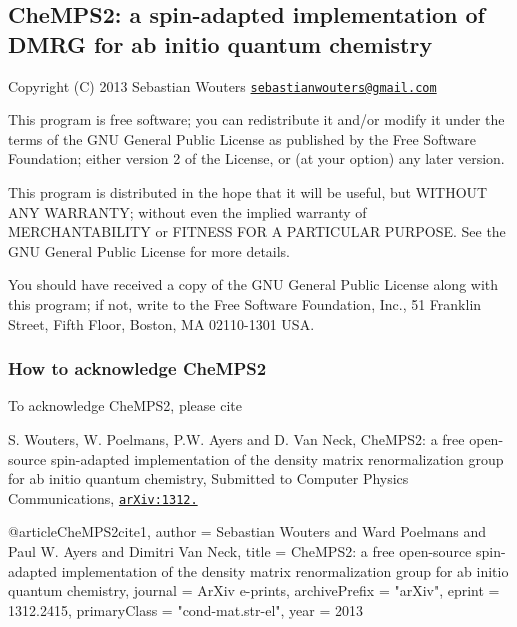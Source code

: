 

\subsection*{Che\-M\-P\-S2\-: a spin-\/adapted implementation of D\-M\-R\-G for ab initio quantum chemistry}

Copyright (C) 2013 Sebastian Wouters \href{mailto:sebastianwouters@gmail.com}{\tt sebastianwouters@gmail.\-com}

This program is free software; you can redistribute it and/or modify it under the terms of the G\-N\-U General Public License as published by the Free Software Foundation; either version 2 of the License, or (at your option) any later version.

This program is distributed in the hope that it will be useful, but W\-I\-T\-H\-O\-U\-T A\-N\-Y W\-A\-R\-R\-A\-N\-T\-Y; without even the implied warranty of M\-E\-R\-C\-H\-A\-N\-T\-A\-B\-I\-L\-I\-T\-Y or F\-I\-T\-N\-E\-S\-S F\-O\-R A P\-A\-R\-T\-I\-C\-U\-L\-A\-R P\-U\-R\-P\-O\-S\-E. See the G\-N\-U General Public License for more details.

You should have received a copy of the G\-N\-U General Public License along with this program; if not, write to the Free Software Foundation, Inc., 51 Franklin Street, Fifth Floor, Boston, M\-A 02110-\/1301 U\-S\-A.

\subsubsection*{How to acknowledge Che\-M\-P\-S2}

To acknowledge Che\-M\-P\-S2, please cite


\begin{DoxyEnumerate}
\item S. Wouters, W. Poelmans, P.\-W. Ayers and D. Van Neck, Che\-M\-P\-S2\-: a free open-\/source spin-\/adapted implementation of the density matrix renormalization group for ab initio quantum chemistry, Submitted to Computer Physics Communications, \href{http://arxiv.org/abs/1312.2415}{\tt ar\-Xiv\-:1312.} \begin{DoxyVerb} @article{CheMPS2cite1,
     author = {Sebastian Wouters and Ward Poelmans and Paul W. Ayers and Dimitri {Van Neck}},
     title = {CheMPS2: a free open-source spin-adapted implementation of the density matrix renormalization group for ab initio quantum chemistry},
     journal = {ArXiv e-prints},
     archivePrefix = "arXiv",
     eprint = {1312.2415},
     primaryClass = "cond-mat.str-el",
     year = {2013}
 }
\end{DoxyVerb}

\end{DoxyEnumerate}


